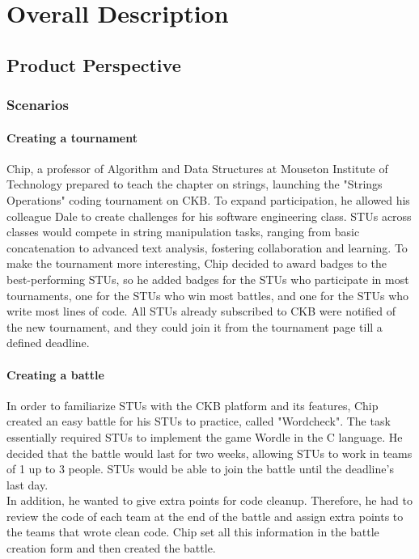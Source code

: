 \chapter{Overall Description}
\section{Product Perspective}
\subsection{Scenarios}

\subsubsection{Creating a tournament}
Chip, a professor of Algorithm and Data Structures at Mouseton Institute of Technology prepared to teach the chapter on strings, launching the "Strings Operations" coding tournament on CKB.
To expand participation, he allowed his colleague Dale to create challenges for his software engineering class.
STUs across classes would compete in string manipulation tasks, ranging from basic concatenation to advanced text analysis, fostering collaboration and learning.
To make the tournament more interesting, Chip decided to award badges to the best-performing STUs, so he added badges for the STUs who participate in most tournaments, one for the STUs who win most battles, and one for the STUs who write most lines of code.
All STUs already subscribed to CKB were notified of the new tournament, and they could join it from the tournament page till a defined deadline.

\subsubsection{Creating a battle}
In order to familiarize STUs with the CKB platform and its features, Chip created an easy battle for his STUs to practice, called "Wordcheck".
The task essentially required STUs to implement the game Wordle in the C language.
He decided that the battle would last for two weeks, allowing STUs to work in teams of 1 up to 3 people. STUs would be able to join the battle until the deadline's last day.\\
In addition, he wanted to give extra points for code cleanup.
Therefore, he had to review the code of each team at the end of the battle and assign extra points to the teams that wrote clean code.
Chip set all this information in the battle creation form and then created the battle.

